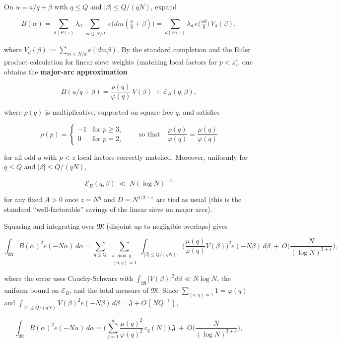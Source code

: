 \documentclass[11pt]{article}
\theoremstyle{definition}
\theoremstyle{remark}
\numberwithin{equation}{part}
\begin{document}
On $\alpha=a/q+\beta$ with $q\le Q$ and $|\beta|\le Q/(qN)$, expand

$$
	B(\alpha)=\sum_{d\mid P(z)}\lambda_d
	\sum_{\substack{m\le N/d}} e\!\big(dm(\tfrac aq+\beta)\big)
	=\sum_{d\mid P(z)}\lambda_d\, e\!\big(\tfrac{ad}{q}\big)\,V_d(\beta),
$$

where $V_d(\beta):=\sum_{m\le N/d}e(dm\beta)$. By the standard completion and the Euler product calculation for linear sieve weights (matching local factors for $p<z$), one obtains the \textbf{major-arc approximation}

$$
	B(a/q+\beta)=\frac{\rho(q)}{\varphi(q)}\,V(\beta)\,+\,\mathcal E_B(q,\beta),
$$

where $\rho(q)$ is multiplicative, supported on square-free $q$, and satisfies

$$
	\rho(p)=
	\begin{cases}
		-1 & \text{for } p\ge 3, \\
		0  & \text{for } p=2,
	\end{cases}
	\qquad\text{so that}\quad \frac{\rho(q)}{\varphi(q)}=\frac{\mu(q)}{\varphi(q)}
$$

for all odd $q$ with $p<z$ local factors correctly matched. Moreover, uniformly for $q\le Q$ and $|\beta|\le Q/(qN)$,

$$
	\mathcal E_B(q,\beta)\ \ll\ N(\log N)^{-A}
$$

for any fixed $A>0$ once $z=N^\eta$ and $D=N^{1/2-\varepsilon}$ are tied as usual (this is the standard “well-factorable” savings of the linear sieve on major arcs).

Squaring and integrating over $\mathfrak M$ (disjoint up to negligible overlaps) gives

$$
	\int_{\mathfrak M} B(\alpha)^2 e(-N\alpha)\,d\alpha
	= \sum_{q\le Q}\ \sum_{\substack{a\bmod q\\(a,q)=1}}
	\int_{|\beta|\le Q/(qN)}
	\Big(\frac{\mu(q)}{\varphi(q)}V(\beta)\Big)^{\!2} e(-N\beta)\,d\beta
	\ +\ O\!\Big(\frac{N}{(\log N)^{3+\varepsilon}}\Big),
$$

where the error uses Cauchy-Schwarz with $\int_{\mathfrak M}|V(\beta)|^2 d\beta\ll N\log N$, the uniform bound on $\mathcal E_B$, and the total measure of $\mathfrak M$.
Since $\sum_{(a,q)=1}1=\varphi(q)$ and $\int_{|\beta|\le Q/(qN)}V(\beta)^2 e(-N\beta)\,d\beta=\mathfrak J+O(NQ^{-1})$,

$$
	\int_{\mathfrak M} B(\alpha)^2 e(-N\alpha)\,d\alpha
	= \Big(\sum_{q=1}^{\infty}\frac{\mu(q)^2}{\varphi(q)^2}\,c_q(N)\Big)\,\mathfrak J
	\ +\ O\!\Big(\frac{N}{(\log N)^{3+\varepsilon}}\Big),
$$
\end{document}

